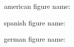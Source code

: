 \documentclass{article}
\begin{document}
american figure name: \figurename

\foreignlanguage{spanish}{spanish figure name: \figurename}

\begin{otherlanguage}{german}
german figure name: \figurename
\end{otherlanguage}
\end{document}
